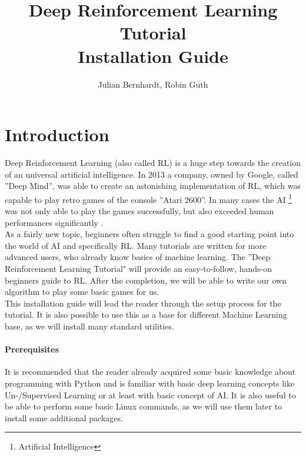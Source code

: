 \documentclass[a4paper]{article}
\title{Deep Reinforcement Learning Tutorial \\Installation Guide}
\author{Julian Bernhardt, Robin Guth}
\begin{document}
\maketitle
\tableofcontents

\section{Introduction}
Deep Reinforcement Learning (also called RL) is a huge step towards the creation of an universal artificial intelligence. In 2013 a company, owned by Google, called ''Deep Mind'', was able to create an astonishing implementation of RL, which was capable to play retro games of the console ''Atari 2600''. In many cases the AI \footnote{Artificial Intelligence} was not only able to play the games successfully, but also exceeded human performances significantly \cite{atari}.\\
As a fairly new topic, beginners often struggle to find a good starting point into the world of AI and specifically RL. Many tutorials are written for more advanced users, who already know basics of machine learning. The ''Deep Reinforcement Learning Tutorial" will provide an easy-to-follow, hands-on beginners guide to RL. After the completion, we will be able to write our own algorithm to play some basic games for us.\\
This installation guide will lead the reader through the setup process for the tutorial. It is also possible to use this as a base for different Machine Learning base, as we will install many standard utilities.
\paragraph{Prerequisites}
It is recommended that the reader already acquired some basic knowledge about programming with Python and is familiar with basic deep learning concepts like Un-/Supervised Learning or at least with basic concept of AI. It is also useful to be able to perform some basic Linux commands, as we will use them later to install some additional packages.
\end{document}
